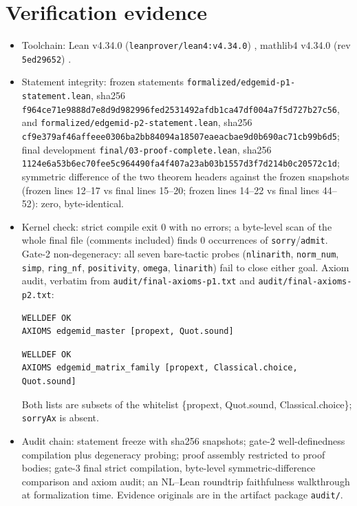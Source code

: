 \documentclass[11pt]{article}
\begin{document}
\section{Verification evidence}

\begin{itemize}
\item Toolchain: Lean v4.34.0 (\texttt{leanprover/lean4:v4.34.0})
\cite{lean4}, mathlib4 v4.34.0 (rev \texttt{5ed29652}) \cite{mathlib}.
\item Statement integrity: frozen statements
\texttt{formalized/edgemid-p1-statement.lean}, sha256
\texttt{f964ce71e9888d7e8d9d982996fed2531492afdb1ca47df004a7f5d727b27c56},
and \texttt{formalized/edgemid-p2-statement.lean}, sha256
\texttt{cf9e379af46affeee0306ba2bb84094a18507eaeacbae9d0b690ac71cb99b6d5};
final development \texttt{final/03-proof-complete.lean}, sha256
\texttt{1124e6a53b6ec70fee5c964490fa4f407a23ab03b1557d3f7d214b0c20572c1d};
symmetric difference of the two theorem headers against the frozen snapshots
(frozen lines 12--17 vs final lines 15--20; frozen lines 14--22 vs final
lines 44--52): zero, byte-identical.
\item Kernel check: strict compile exit 0 with no errors; a byte-level scan of
the whole final file (comments included) finds 0 occurrences of
\texttt{sorry}/\texttt{admit}. Gate-2 non-degeneracy: all seven bare-tactic
probes (\texttt{nlinarith}, \texttt{norm\_num}, \texttt{simp},
\texttt{ring\_nf}, \texttt{positivity}, \texttt{omega}, \texttt{linarith})
fail to close either goal. Axiom audit, verbatim from
\texttt{audit/final-axioms-p1.txt} and \texttt{audit/final-axioms-p2.txt}:
\begin{verbatim}
WELLDEF OK
AXIOMS edgemid_master [propext, Quot.sound]
\end{verbatim}
\begin{verbatim}
WELLDEF OK
AXIOMS edgemid_matrix_family [propext, Classical.choice, Quot.sound]
\end{verbatim}
Both lists are subsets of the whitelist \{propext, Quot.sound,
Classical.choice\}; \texttt{sorryAx} is absent.
\item Audit chain: statement freeze with sha256 snapshots; gate-2
well-definedness compilation plus degeneracy probing; proof assembly
restricted to proof bodies; gate-3 final strict compilation, byte-level
symmetric-difference comparison and axiom audit; an NL--Lean roundtrip
faithfulness walkthrough at formalization time. Evidence originals are in
the artifact package \texttt{audit/}.
\end{itemize}
\end{document}
